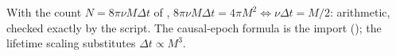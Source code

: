 With the count $N = 8\pi\nu M\Delta t$ of , $8\pi\nu M\Delta t = 4\pi M^2 \iff \nu\Delta t = M/2$: arithmetic, checked exactly by the script. The causal-epoch formula is the import (); the lifetime scaling substitutes $\Delta t \propto M^3$.

